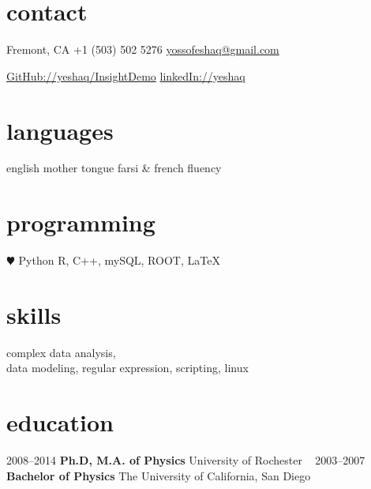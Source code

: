 \documentclass[]{friggeri-cv} %
\begin{document}


\begin{aside} %
\section{contact}
\footnotesize{Fremont, CA}
+1 (503) 502 5276
\href{mailto:yossofeshaq@gmail.com}{yossofeshaq@gmail.com}

\href{http://github.com/yeshaq/InsightDemo}{GitHub://yeshaq/InsightDemo}
\href{http://linkedIn.com/yossofeshaq}{linkedIn://yeshaq}
\section{languages}
english mother tongue
farsi \& french fluency
\section{programming}
{\color{red} $\varheartsuit$} Python
R, C++, mySQL, ROOT, LaTeX
\section{skills}
complex data analysis, \\data modeling, 
regular expression, scripting, linux

\section{education}
2008--2014
\textbf{Ph.D, M.A. {\normalfont of Physics}}
University of Rochester
~
2003--2007
{\textbf{Bachelor {\normalfont of Physics}}}
{The University of California, San Diego}


\end{aside}


\end{document}

